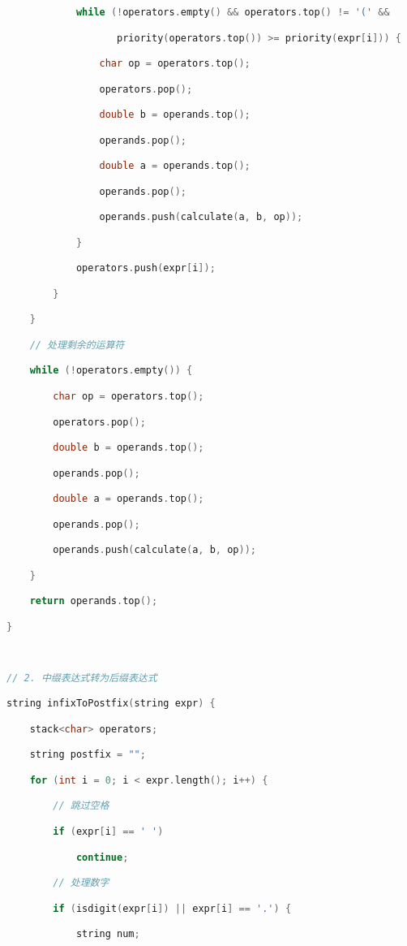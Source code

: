 \begin{lstlisting}[language=C++]
            while (!operators.empty() && operators.top() != '(' &&

                   priority(operators.top()) >= priority(expr[i])) {

                char op = operators.top();

                operators.pop();

                double b = operands.top();

                operands.pop();

                double a = operands.top();

                operands.pop();

                operands.push(calculate(a, b, op));

            }

            operators.push(expr[i]);

        }

    }

    // 处理剩余的运算符

    while (!operators.empty()) {

        char op = operators.top();

        operators.pop();

        double b = operands.top();

        operands.pop();

        double a = operands.top();

        operands.pop();

        operands.push(calculate(a, b, op));

    }

    return operands.top();

}

  

// 2. 中缀表达式转为后缀表达式

string infixToPostfix(string expr) {

    stack<char> operators;

    string postfix = "";

    for (int i = 0; i < expr.length(); i++) {

        // 跳过空格

        if (expr[i] == ' ')

            continue;

        // 处理数字

        if (isdigit(expr[i]) || expr[i] == '.') {

            string num;


\end{lstlisting}
